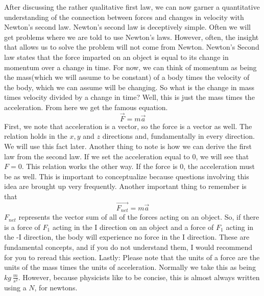 After discussing the rather qualitative first law, we can now garner a quantitative understanding of the connection between forces and changes in velocity with Newton’s second law. Newton’s second law is deceptively simple. Often we will get problems where we are told to use Newton’s laws. However, often, the insight that allows us to solve the problem will not come from Newton. Newton’s Second law states that the force imparted on an object is equal to its change in momentum over a change in time. For now, we can think of momentum as being the mass(which we will assume to be constant) of a body times the velocity of the body, which we can assume will be changing. So what is the change in mass times velocity divided by a change in time? Well, this is just the mass times the acceleration. From here we get the famous equation. \begin{equation}\vec{F}=m\vec{a}\end{equation} First, we note that acceleration is a vector, so the force is a vector as well. The relation holds in the $x,y$ and $z$ directions and, fundamentally in every direction. We will use this fact later. Another thing to note is how we can derive the first law from the second law. If we set the acceleration equal to 0, we will see that $F=0$. This relation works the other way. If the force is 0, the acceleration must be as well. This is important to conceptualize because questions involving this idea are brought up very frequently. Another important thing to remember is that \begin{equation}\vec{F_{net}}=m\vec{a}\end{equation} $F_{net}$ represents the vector sum of all of the forces acting on an object. So, if there is a force of $F_1$ acting in the I direction on an object and a force of $F_1$ acting in the -I direction, the body will experience no force in the I direction. These are fundamental concepts, and if you do not understand them, I would recommend for you to reread this section. Lastly: Please note that the units of a force are the units of the mass times the units of acceleration. Normally we take this as being $kg \ \frac{m}{s^2}$. However, because physicists like to be concise, this is almost always written using a $N$, for newtons. 